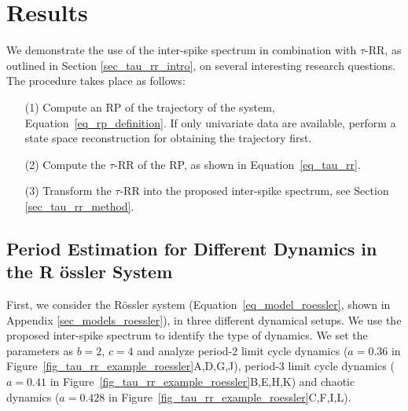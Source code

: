 \documentclass[entropy,article,accept,pdftex,moreauthors]{Definitions/mdpi}
\begin{document}
%

\section{Results}\label{sec_tau_rr_application}

We demonstrate the use of the inter-spike spectrum in combination with $\tau$-RR, as outlined in 
Section \ref{sec_tau_rr_intro}, on several interesting research questions. The procedure takes place as follows:
\begin{itemize}[noitemsep]
\item[(1)] Compute an RP of the trajectory of the system, Equation~\eqref{eq_rp_definition}. If only univariate data are available, perform a state space reconstruction for obtaining the trajectory first.
\item[(2)] Compute the $\tau$-RR of the RP, as shown in Equation~\eqref{eq_tau_rr}.
\item[(3)] Transform the $\tau$-RR into the proposed inter-spike spectrum, see Section \ref{sec_tau_rr_method}.
\end{itemize}


\subsection{Period Estimation for Different Dynamics in the R \"ossler System}
First, we consider the R\"ossler system (Equation~\eqref{eq_model_roessler}, shown in Appendix \ref{sec_models_roessler}), 
in three different dynamical setups. We use the proposed inter-spike spectrum to
identify the type of dynamics.
We set the parameters as $b=2$, $c=4$ and analyze period-2 limit cycle dynamics ($a=0.36$ in Figure~\ref{fig_tau_rr_example_roessler}A,D,G,J), 
period-3 limit cycle dynamics ($a=0.41$ in Figure~\ref{fig_tau_rr_example_roessler}B,E,H,K) and chaotic dynamics ($a=0.428$ in Figure~\ref{fig_tau_rr_example_roessler}C,F,I,L).  
\end{document}
